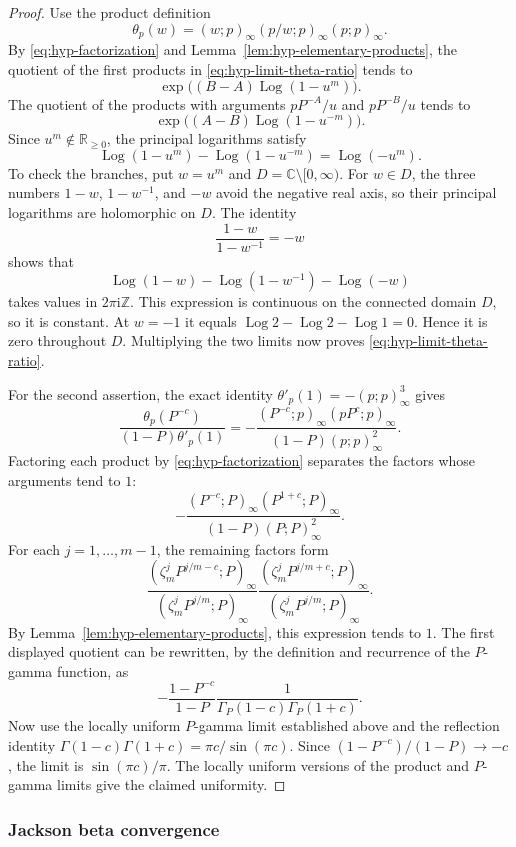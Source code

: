 \documentclass[12pt]{amsart}
\theoremstyle{definition}
\numberwithin{equation}{section}
\theoremstyle{definition}
\let\tht\theta
\let\ge\geqslant
\def\C{{\mathbb C}}
\def\Z{{\mathbb Z}}
\def\R{{\mathbb R}}
\begin{document}
\begin{proof}
Use the product definition
\[
 \tht_p(w)=(w;p)_\infty(p/w;p)_\infty(p;p)_\infty.
\]
By \eqref{eq:hyp-factorization} and
Lemma~\ref{lem:hyp-elementary-products}, the quotient
of the first products in \eqref{eq:hyp-limit-theta-ratio}
tends to
\[
 \exp\bigl((B-A)\operatorname{Log}(1-u^m)\bigr).
\]
The quotient of the products with arguments
$pP^{-A}/u$ and $pP^{-B}/u$ tends to
\[
 \exp\bigl((A-B)\operatorname{Log}(1-u^{-m})\bigr).
\]
Since $u^m\notin\R_{\ge0}$, the principal logarithms satisfy
\[
 \operatorname{Log}(1-u^m)-\operatorname{Log}(1-u^{-m})
 =\operatorname{Log}(-u^m).
\]
To check the branches, put $w=u^m$ and
$D=\C\setminus[0,\infty)$.  For $w\in D$, the three numbers
$1-w$, $1-w^{-1}$, and $-w$ avoid the negative real axis,
so their principal logarithms are holomorphic on $D$.
The identity
\[
 \frac{1-w}{1-w^{-1}}=-w
\]
shows that
\[
 \operatorname{Log}(1-w)-\operatorname{Log}(1-w^{-1})
                    -\operatorname{Log}(-w)
\]
takes values in $2\pi\mathrm{i}\Z$.  This expression is
continuous on the connected domain $D$, so it is constant.
At $w=-1$ it equals $\operatorname{Log}2-\operatorname{Log}2-
\operatorname{Log}1=0$.  Hence it is zero throughout $D$.
Multiplying the two limits now proves
\eqref{eq:hyp-limit-theta-ratio}.

For the second assertion, the exact identity
$\tht'_p(1)=-(p;p)_\infty^3$ gives
\[
 \frac{\tht_p(P^{-c})}{(1-P)\tht'_p(1)}
 =-\frac{(P^{-c};p)_\infty(pP^c;p)_\infty}
          {(1-P)(p;p)_\infty^2}.
\]
Factoring each product by \eqref{eq:hyp-factorization}
separates the factors whose arguments tend to $1$:
\[
 -\frac{(P^{-c};P)_\infty(P^{1+c};P)_\infty}
        {(1-P)(P;P)_\infty^2}.
\]
For each $j=1,\ldots,m-1$, the remaining factors form
\[
 \frac{(\zeta_m^jP^{j/m-c};P)_\infty}
      {(\zeta_m^jP^{j/m};P)_\infty}
 \frac{(\zeta_m^jP^{j/m+c};P)_\infty}
      {(\zeta_m^jP^{j/m};P)_\infty}.
\]
By Lemma~\ref{lem:hyp-elementary-products}, this
expression tends to $1$.  The first displayed quotient
can be rewritten, by the definition and recurrence of the
$P$-gamma function, as
\[
 -\frac{1-P^{-c}}{1-P}
  \frac{1}{\Gamma_P(1-c)\Gamma_P(1+c)}.
\]
Now use the locally uniform $P$-gamma limit established
above and the reflection identity
$\Gamma(1-c)\Gamma(1+c)=\pi c/\sin(\pi c)$.
Since $(1-P^{-c})/(1-P)\to-c$, the limit is
$\sin(\pi c)/\pi$.  The locally uniform versions of the
product and $P$-gamma limits give the claimed uniformity.
\end{proof}

\subsubsection{Jackson beta convergence}
\end{document}
